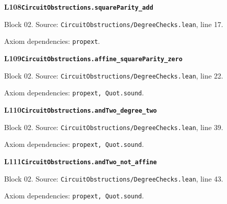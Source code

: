 \begin{minipage}{\linewidth}
\hypertarget{L108}{}
{\small\sffamily\bfseries\color{ink}L108\quad\nolinkurl{CircuitObstructions.squareParity_add}}\par
{\scriptsize\sffamily\color{muted}Block 02. Source: \nolinkurl{CircuitObstructions/DegreeChecks.lean}, line 17.}\par
{}
{\scriptsize\sffamily\color{muted}Axiom dependencies: \nolinkurl{propext}.}
\end{minipage}\par\medskip
\begin{minipage}{\linewidth}
\hypertarget{L109}{}
{\small\sffamily\bfseries\color{ink}L109\quad\nolinkurl{CircuitObstructions.affine_squareParity_zero}}\par
{\scriptsize\sffamily\color{muted}Block 02. Source: \nolinkurl{CircuitObstructions/DegreeChecks.lean}, line 22.}\par
{}
{\scriptsize\sffamily\color{muted}Axiom dependencies: \nolinkurl{propext, Quot.sound}.}
\end{minipage}\par\medskip
\begin{minipage}{\linewidth}
\hypertarget{L110}{}
{\small\sffamily\bfseries\color{ink}L110\quad\nolinkurl{CircuitObstructions.andTwo_degree_two}}\par
{\scriptsize\sffamily\color{muted}Block 02. Source: \nolinkurl{CircuitObstructions/DegreeChecks.lean}, line 39.}\par
{}
{\scriptsize\sffamily\color{muted}Axiom dependencies: \nolinkurl{propext, Quot.sound}.}
\end{minipage}\par\medskip
\begin{minipage}{\linewidth}
\hypertarget{L111}{}
{\small\sffamily\bfseries\color{ink}L111\quad\nolinkurl{CircuitObstructions.andTwo_not_affine}}\par
{\scriptsize\sffamily\color{muted}Block 02. Source: \nolinkurl{CircuitObstructions/DegreeChecks.lean}, line 43.}\par
{}
{\scriptsize\sffamily\color{muted}Axiom dependencies: \nolinkurl{propext, Quot.sound}.}
\end{minipage}\par\medskip
